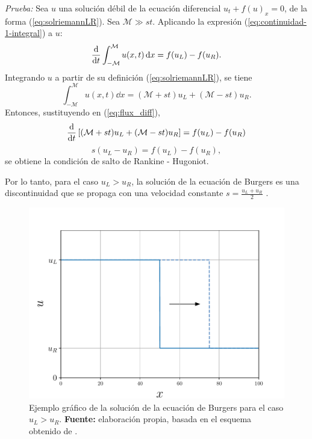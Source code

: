 \textit{Prueba:} Sea $u$ una solución débil de la ecuación diferencial $u_t + f(u)_x = 0$, de la forma (\ref{eq:solriemannLR}). Sea $\mathcal{M} \gg st$. Aplicando la expresión (\ref{eq:continuidad-1-integral}) a $u$:
\begin{equation}
	\dv{t} \int_{-\mathcal{M}}^{\mathcal{M}}u(x,t)\dd{x} = f(u_L) - f(u_R).
	\label{eq:flux_diff}
\end{equation}
Integrando $u$ a partir de su definición (\ref{eq:solriemannLR}), se tiene
\begin{equation}
	\int_{-\mathcal{M}}^{\mathcal{M}}u(x,t)\dd{x} = (\mathcal{M} + st)u_L + (\mathcal{M} - st)u_R.
\end{equation}
Entonces, sustituyendo en (\ref{eq:flux_diff}),
\begin{equation}
	\dv{t}\left[(\mathcal{M} + st)u_L + (\mathcal{M} - st)u_R\right] = f(u_L) - f(u_R)
\end{equation}
\begin{equation}
	s(u_L - u_R) = f(u_L) - f(u_R),
\end{equation}
se obtiene la condición de salto de Rankine - Hugoniot.

Por lo tanto, para el caso $u_L > u_R$, la solución de la ecuación de Burgers es una discontinuidad que se propaga con una velocidad constante $s = \frac{u_L + u_R}{2}$ \cite{Cameron}.

\begin{figure}[ht]
	\centering
	\includegraphics[width=0.8\linewidth]{../some_plots/cap1/graficas/riemannLR.pdf}
	\caption{Ejemplo gráfico de la solución de la ecuación de Burgers para el caso $u_L > u_R$. \textbf{Fuente: }elaboración propia, basada en el esquema obtenido de \cite{LeVeque}.}
	\label{fig:solriemannLR}
\end{figure}

